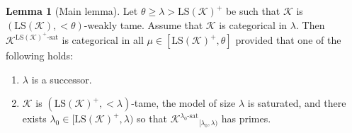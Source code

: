 \documentclass[12pt]{amsart}
\theoremstyle{definition}
\newtheorem{lem}[mydef]{Lemma}
\begin{document}
\begin{lem}[Main lemma]\label{main-lem}
  Let $\theta \ge \lambda > {\text{LS}} ({\mathcal{K}})^+$ be such that ${\mathcal{K}}$ is $({\text{LS}} ({\mathcal{K}}), <\theta)$-weakly tame. Assume that ${\mathcal{K}}$ is categorical in $\lambda$. Then ${{{{\mathcal{K}}}^{{{{\text{LS}} ({\mathcal{K}})^+}}\text{-sat}}}}$ is categorical in all $\mu \in [{\text{LS}} ({\mathcal{K}})^+, \theta]$ provided that one of the following holds:
  
  \begin{enumerate}
    \item $\lambda$ is a successor.
    \item ${\mathcal{K}}$ is $({\text{LS}} ({\mathcal{K}})^+, < \lambda)$-tame, the model of size $\lambda$ is saturated, and there exists $\lambda_0 \in [{\text{LS}} ({\mathcal{K}})^+, \lambda)$ so that ${{{{\mathcal{K}}}^{{{\lambda_0}}\text{-sat}}}}_{[\lambda_0, \lambda)}$ has primes.
  \end{enumerate}
\end{lem}
\end{document}

